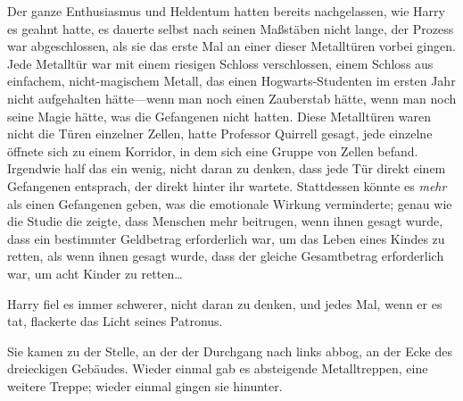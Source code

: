 Der ganze Enthusiasmus und Heldentum hatten bereits nachgelassen, wie Harry es geahnt hatte, es dauerte selbst nach seinen Maßstäben nicht lange, der Prozess war abgeschlossen, als sie das erste Mal an einer dieser Metalltüren vorbei gingen. Jede Metalltür war mit einem riesigen Schloss verschlossen, einem Schloss aus einfachem, nicht-magischem Metall, das einen Hogwarts-Studenten im ersten Jahr nicht aufgehalten hätte—wenn man noch einen Zauberstab hätte, wenn man noch seine Magie hätte, was die Gefangenen nicht hatten. Diese Metalltüren waren nicht die Türen einzelner Zellen, hatte Professor Quirrell gesagt, jede einzelne öffnete sich zu einem Korridor, in dem sich eine Gruppe von Zellen befand. Irgendwie half das ein wenig, nicht daran zu denken, dass jede Tür direkt einem Gefangenen entsprach, der direkt hinter ihr wartete. Stattdessen könnte es \emph{mehr} als einen Gefangenen geben, was die emotionale Wirkung verminderte; genau wie die Studie die zeigte, dass Menschen mehr beitrugen, wenn ihnen gesagt wurde, dass ein bestimmter Geldbetrag erforderlich war, um das Leben eines Kindes zu retten, als wenn ihnen gesagt wurde, dass der gleiche Gesamtbetrag erforderlich war, um acht Kinder zu retten…

Harry fiel es immer schwerer, nicht daran zu denken, und jedes Mal, wenn er es tat, flackerte das Licht seines Patronus.

Sie kamen zu der Stelle, an der der Durchgang nach links abbog, an der Ecke des dreieckigen Gebäudes. Wieder einmal gab es absteigende Metalltreppen, eine weitere Treppe; wieder einmal gingen sie hinunter.

